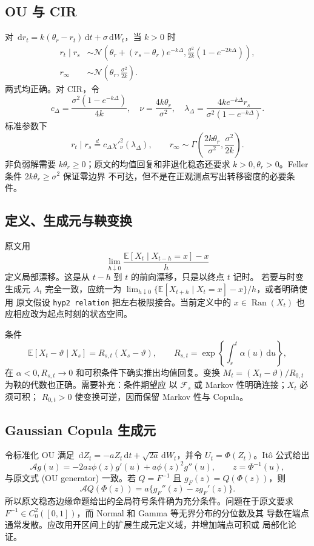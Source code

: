 \documentclass[UTF8,11pt]{ctexart}
\newcommand{\dd}{\,\mathrm d}
\newcommand{\E}{\mathbb E}
\newcommand{\Normal}{\mathcal N}
\begin{document}
\subsection{OU 与 CIR}

对 $\dd r_t=k(\theta_r-r_t)\dd t+\sigma\dd W_t$，当 $k>0$ 时
\begin{align*}
 r_t\mid r_s&\sim \Normal\left(
 \theta_r+(r_s-\theta_r)e^{-k\Delta},
 \frac{\sigma^2}{2k}(1-e^{-2k\Delta})\right),\\
 r_\infty&\sim\Normal\left(\theta_r,\frac{\sigma^2}{2k}\right).
\end{align*}
两式均正确。对 CIR，令
\[
 c_\Delta=\frac{\sigma^2(1-e^{-k\Delta})}{4k},\quad
 \nu=\frac{4k\theta_r}{\sigma^2},\quad
 \lambda_\Delta=
 \frac{4ke^{-k\Delta}r_s}{\sigma^2(1-e^{-k\Delta})}.
\]
标准参数下
\[
 r_t\mid r_s\overset d=c_\Delta\chi'^2_\nu(\lambda_\Delta),\qquad
 r_\infty\sim\Gamma\!\left(\frac{2k\theta_r}{\sigma^2},
 \frac{\sigma^2}{2k}\right).
\]
非负弱解需要 $k\theta_r\geq0$；原文的均值回复和非退化稳态还要求
$k>0,\theta_r>0$。Feller 条件 $2k\theta_r\geq\sigma^2$ 保证零边界
不可达，但不是在正观测点写出转移密度的必要条件。

\subsection{定义、生成元与鞅变换}

原文用
\[
 \lim_{h\downarrow0}\frac{\E[X_t\mid X_{t-h}=x]-x}{h}
\]
定义局部漂移。这是从 $t-h$ 到 $t$ 的前向漂移，只是以终点 $t$ 记时。
若要与时变生成元 $A_t$ 完全一致，应统一为
$\lim_{h\downarrow0}\{\E[X_{t+h}\mid X_t=x]-x\}/h$，或者明确使用
原文假设 \texttt{hyp2 relation} 把左右极限接合。当前定义中的
$x\in\operatorname{Ran}(X_t)$ 也应相应改为起点时刻的状态空间。

条件
\[
 \E[X_t-\vartheta\mid X_s]
 =R_{s,t}(X_s-\vartheta),\qquad
 R_{s,t}=\exp\left\{\int_s^t\alpha(u)\dd u\right\},
\]
在 $\alpha<0,R_{s,t}\to0$ 和可积条件下确实推出均值回复。变换
$M_t=(X_t-\vartheta)/R_{0,t}$ 为鞅的代数也正确。需要补充：条件期望应
以 $\mathcal F_s$ 或 Markov 性明确连接；$X_t$ 必须可积；
$R_{0,t}>0$ 使变换可逆，因而保留 Markov 性与 Copula。

\subsection{Gaussian Copula 生成元}

令标准化 OU 满足
$\dd Z_t=-aZ_t\dd t+\sqrt{2a}\dd W_t$，并令 $U_t=\Phi(Z_t)$。It\^o
公式给出
\[
 \mathcal A g(u)=-2a z\phi(z)g'(u)+a\phi(z)^2g''(u),
 \qquad z=\Phi^{-1}(u),
\]
与原文式 (OU generator) 一致。若 $Q=F^{-1}$ 且
$g_F(z)=Q(\Phi(z))$，则
\[
 \mathcal A Q(\Phi(z))=a\{g_F''(z)-zg_F'(z)\}.
\]
所以原文稳态边缘命题给出的全局符号条件确为充分条件。问题在于原文要求
$F^{-1}\in C_0^2([0,1])$，而 Normal 和 Gamma 等无界分布的分位数及其
导数在端点通常发散。应改用开区间上的扩展生成元定义域，并增加端点可积或
局部化论证。
\end{document}

